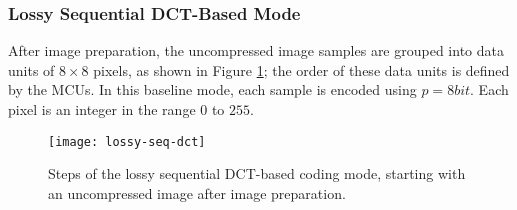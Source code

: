 %

\subsubsection*{Lossy Sequential DCT-Based Mode}
After image preparation, the uncompressed image samples are grouped into data units of $ 8 \times 8 $ pixels, as shown in Figure {\ref{fig:lossy-seq-dct}}; the order of these data units is defined by the MCUs. In this baseline mode, each sample is encoded using $ p=8bit $. Each pixel is an integer in the range $ 0 $ to $ 255 $.

\begin{figure}[h]
	\centering
	\texttt{[image: lossy-seq-dct]}
	\caption[Steps of the lossy sequential DCT-based coding mode]{Steps of the lossy sequential DCT-based coding mode, starting with an
		uncompressed image after image preparation.}{\label{fig:lossy-seq-dct}}
\end{figure}


